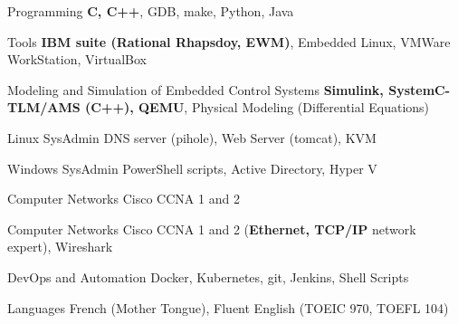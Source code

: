 

\begin{cvskills}
{

    \cvskill
    {Programming} %
    {\textbf{C, C++}, GDB, make, Python, Java} %

    \cvskill
    {Tools}
    {\textbf{IBM suite (Rational Rhapsdoy, EWM)}, Embedded Linux, VMWare WorkStation, VirtualBox}

    \cvskill
    {Modeling and Simulation of Embedded Control Systems} %
    {\textbf{Simulink, SystemC-TLM/AMS (C++), QEMU}, Physical Modeling (Differential Equations)} %

	}{}
{

    \cvskill
    {Linux SysAdmin} %
    {DNS server (pihole), Web Server (tomcat), KVM} %

    \cvskill
    {Windows SysAdmin} %
    {PowerShell scripts, Active Directory, Hyper V} %

    \cvskill
    {Computer Networks} %
    {Cisco CCNA 1 and 2} %

}{}
    \cvskill
    {Computer Networks} %
    {Cisco CCNA 1 and 2 (\textbf{Ethernet, TCP/IP} network expert), Wireshark} %

    \cvskill
    {DevOps and Automation} %
    {Docker, Kubernetes, git, Jenkins, Shell Scripts} %

    \cvskill
    {Languages} %
    {French (Mother Tongue), Fluent English (TOEIC 970, TOEFL 104)} %

\end{cvskills}
